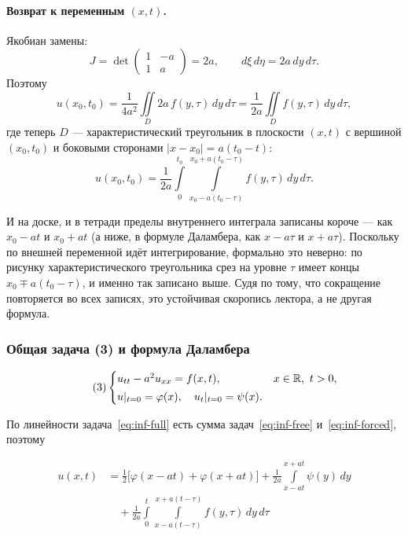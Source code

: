 \paragraph{Возврат к переменным $(x,t)$.} Якобиан замены:
\[
  J = \det \begin{pmatrix} 1 & -a \\ 1 & a \end{pmatrix} = 2a ,
  \qquad d\xi\, d\eta = 2a \, dy \, d\tau .
\]
Поэтому
\[
  u(x_0,t_0) = \frac{1}{4a^2} \iint\limits_{D} 2a\, f(y,\tau)\, dy\, d\tau
             = \frac{1}{2a} \iint\limits_{D} f(y,\tau)\, dy\, d\tau ,
\]
где теперь $D$ — характеристический треугольник в плоскости $(x,t)$ с вершиной
$(x_0,t_0)$ и боковыми сторонами $|x - x_0| = a(t_0 - t)$:
\[
  u(x_0,t_0) = \frac{1}{2a} \int\limits_0^{t_0}
  \int\limits_{x_0 - a(t_0-\tau)}^{\,x_0 + a(t_0-\tau)} f(y,\tau)\, dy\, d\tau .
\]


\begin{warn}
И на доске, и в тетради пределы внутреннего интеграла записаны короче — как
$x_0 - at$ и $x_0 + at$ (а ниже, в формуле Даламбера, как $x - a\tau$ и
$x + a\tau$). Поскольку по внешней переменной идёт интегрирование, формально
это неверно: по рисунку характеристического треугольника срез на уровне $\tau$
имеет концы $x_0 \mp a(t_0 - \tau)$, и именно так записано выше. Судя по тому,
что сокращение повторяется во всех записях, это устойчивая скоропись лектора,
а не другая формула.
\end{warn}

\subsubsection*{Общая задача (3) и формула Даламбера}

\begin{equation}\tag{3}\label{eq:inf-full}
  \begin{cases}
    u_{tt} - a^2 u_{xx} = f(x,t), & x \in \mathbb{R},\ t > 0, \\[2pt]
    u|_{t=0} = \varphi(x), \quad u_t|_{t=0} = \psi(x) .
  \end{cases}
\end{equation}

По линейности задача~\eqref{eq:inf-full} есть сумма задач~\eqref{eq:inf-free}
и~\eqref{eq:inf-forced}, поэтому

\begin{equation}\tag{Д}\label{eq:dalembert}
  \boxed{
  \begin{aligned}
    u(x,t) &= \frac12\Big[\varphi(x-at) + \varphi(x+at)\Big]
            + \frac{1}{2a}\int\limits_{x-at}^{x+at} \psi(y)\, dy \\[4pt]
           &\quad + \frac{1}{2a} \int\limits_0^t
             \int\limits_{x-a(t-\tau)}^{\,x+a(t-\tau)} f(y,\tau)\, dy\, d\tau
  \end{aligned}}
\end{equation}

